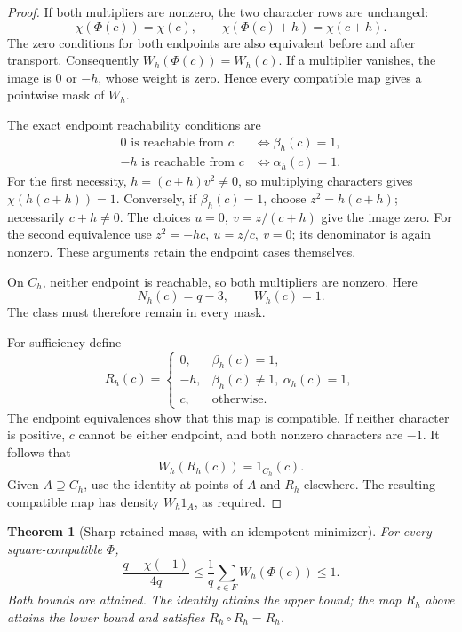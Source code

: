 \documentclass[11pt]{article}
\newtheorem{theorem}{Theorem}[section]
\begin{document}
\begin{proof}
If both multipliers are nonzero, the two character rows are unchanged:
\[
 \chi(\Phi(c))=\chi(c),\qquad
 \chi(\Phi(c)+h)=\chi(c+h).
\]
The zero conditions for both endpoints are also equivalent before and
after transport. Consequently \(W_h(\Phi(c))=W_h(c)\).
If a multiplier vanishes, the image is \(0\) or \(-h\), whose weight
is zero. Hence every compatible map gives a pointwise mask of \(W_h\).

The exact endpoint reachability conditions are
\[
 \begin{split}
 0\text{ is reachable from }c
     &\iff \beta_h(c)=1,\\
 -h\text{ is reachable from }c
     &\iff \alpha_h(c)=1.
 \end{split}
\]
For the first necessity, \(h=(c+h)v^2\ne0\), so multiplying
characters gives \(\chi(h(c+h))=1\).
Conversely, if \(\beta_h(c)=1\), choose
\(z^2=h(c+h)\); necessarily \(c+h\ne0\). The choices
\(u=0,\ v=z/(c+h)\) give the image zero.
For the second equivalence use
\(z^2=-hc,\ u=z/c,\ v=0\); its denominator is again nonzero.
These arguments retain the endpoint cases themselves.

On \(C_h\), neither endpoint is reachable, so both multipliers
are nonzero. Here
\[
                         N_h(c)=q-3,\qquad W_h(c)=1.
\]
The class must therefore remain in every mask.

For sufficiency define
\[
 R_h(c)=
 \begin{cases}
 0,&\beta_h(c)=1,\\
 -h,&\beta_h(c)\ne1,\ \alpha_h(c)=1,\\
 c,&\text{otherwise}.
 \end{cases}
\]
The endpoint equivalences show that this map is compatible.
If neither character is positive, \(c\) cannot be either endpoint,
and both nonzero characters are \(-1\). It follows that
\[
                         W_h(R_h(c))=1_{C_h}(c).
\]
Given \(A\supseteq C_h\), use the identity at points of \(A\) and
\(R_h\) elsewhere. The resulting compatible map has density
\(W_h1_A\), as required.
\end{proof}

\begin{theorem}[Sharp retained mass, with an idempotent minimizer]
\label{thm:squareTransportMinimum}
For every square-compatible \(\Phi\),
\[
 \boxed{\quad
 \frac{q-\chi(-1)}{4q}
       \le \frac1q\sum_{c\in F}W_h(\Phi(c))
       \le1.\quad}
\]
Both bounds are attained. The identity attains the upper bound;
the map \(R_h\) above attains the lower bound and satisfies
\(R_h\circ R_h=R_h\).
\end{theorem}
\end{document}
